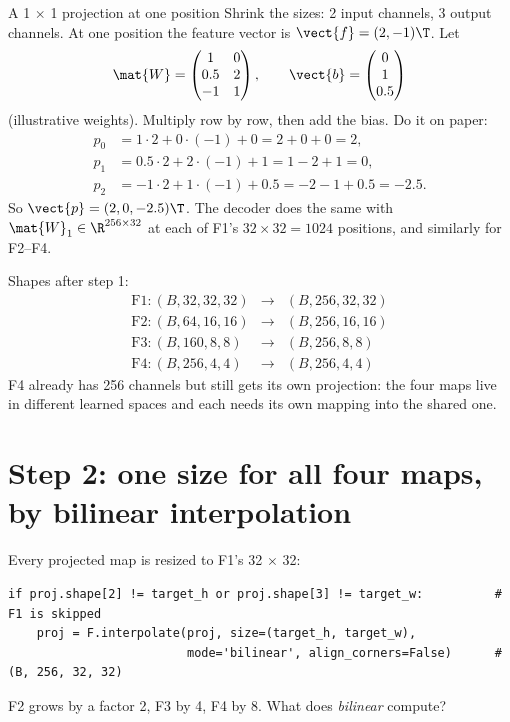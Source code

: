 \begin{worked}[label={we:decoder:proj}]{A 1 \texorpdfstring{$\times$}{x} 1 projection at one position}
Shrink the sizes: 2 input channels, 3 output channels. At one position the feature vector is
$\vect{f} = (2, -1)\T$. Let
\[
\mat{W} = \begin{pmatrix} 1 & 0\\ 0.5 & 2\\ -1 & 1 \end{pmatrix}, \qquad \vect{b} = \begin{pmatrix} 0\\ 1\\ 0.5 \end{pmatrix}
\]
(illustrative weights). Multiply row by row, then add the bias. Do it on paper:
\begin{align*}
p_0 &= 1 \cdot 2 + 0 \cdot (-1) + 0 = 2 + 0 + 0 = 2,\\
p_1 &= 0.5 \cdot 2 + 2 \cdot (-1) + 1 = 1 - 2 + 1 = 0,\\
p_2 &= -1 \cdot 2 + 1 \cdot (-1) + 0.5 = -2 - 1 + 0.5 = -2.5 .
\end{align*}
So $\vect{p} = (2, 0, -2.5)\T$. The decoder does the same with $\mat{W}_1 \in \R^{256 \times 32}$ at each
of F1's $32 \times 32 = 1024$ positions, and similarly for F2--F4.
\end{worked}

Shapes after step 1:
\[
\begin{array}{lll}
\text{F1}: (B, 32, 32, 32) & \to & (B, 256, 32, 32)\\
\text{F2}: (B, 64, 16, 16) & \to & (B, 256, 16, 16)\\
\text{F3}: (B, 160, 8, 8) & \to & (B, 256, 8, 8)\\
\text{F4}: (B, 256, 4, 4) & \to & (B, 256, 4, 4)
\end{array}
\]
F4 already has 256 channels but still gets its own projection: the four maps live in different learned
spaces and each needs its own mapping into the shared one.

\section{Step 2: one size for all four maps, by bilinear interpolation}\label{sec:decoder:bilinear}

Every projected map is resized to F1's 32 $\times$ 32:
\begin{lstlisting}
if proj.shape[2] != target_h or proj.shape[3] != target_w:          # F1 is skipped
    proj = F.interpolate(proj, size=(target_h, target_w),
                         mode='bilinear', align_corners=False)      # (B, 256, 32, 32)
\end{lstlisting}
F2 grows by a factor 2, F3 by 4, F4 by 8. What does \emph{bilinear} compute?

